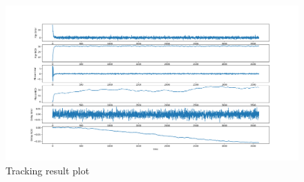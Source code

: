 \begin{normalsize}
\begin{figure}[ht]
\centering
\includegraphics[width=1\columnwidth]{figs/tracking_plot.png}
\centering
\captionsetup{justification=centering}
\caption{Tracking result plot}
\label{fig:tracking_plot}
\end{figure}
\end{normalsize}






